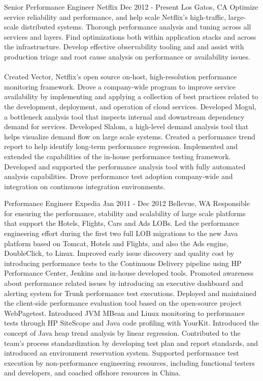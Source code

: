 \documentclass[]{mspier-cv}
\begin{document}
\experienceitem
  {Senior Performance Engineer}
  {Netflix}
  {Dec 2012 - Present}
  {Los Gatos, CA}
  {Optimize service reliability and performance, and help scale Netflix's high-traffic, large-scale distributed systems. Thorough performance analysis and tuning across all services and layers. Find optimizations both within application stacks and across the infrastructure. Develop effective observability tooling and and assist with production triage and root cause analysis on performance or availability issues.\\\\
  Created Vector, Netflix's open source on-host, high-resolution performance monitoring framework. Drove a company-wide program to improve service availability by implementing and applying a collection of best practices related to the development, deployment, and operation of cloud services. Developed Mogul, a bottleneck analysis tool that inspects internal and downstream dependency demand for services. Developed Slalom, a high-level demand analysis tool that helps visualize demand flow on large scale systems. Created a performance trend report to help identify long-term performance regression. Implemented and extended the capabilities of the in-house performance testing framework. Developed and supported the performance analysis tool with fully automated analysis capabilities. Drove performance test adoption company-wide and integration on continuous integration environments.\\}

\experienceitem
  {Performance Engineer}
  {Expedia}
  {Jan 2011 - Dec 2012}
  {Bellevue, WA}
  {
    Responsible for ensuring the performance, stability and scalability of large scale platforms that support the Hotels, Flights, Cars and Ads LOBs.
    Led the performance engineering effort during the first two full LOB migrations to the new Java platform based on Tomcat, Hotels and Flights, and also the Ads engine, DoubleClick, to Linux.
    Improved early issue discovery and quality cost by introducing performance tests to the Continuous Delivery pipeline using HP Performance Center, Jenkins and in-house developed tools.
    Promoted awareness about performance related issues by introducing an executive dashboard and alerting system for Trunk performance test executions.
    Deployed and maintained the client-side performance evaluation tool based on the open-source project WebPagetest.
    Introduced JVM MBean and Linux monitoring to performance tests through HP SiteScope and Java code profiling with YourKit.
    Introduced the concept of Java heap trend analysis by linear regression.
    Contributed to the team’s process standardization by developing test plan and report standards, and introduced an environment reservation system.
    Supported performance test execution by non-performance engineering resources, including functional testers and developers, and coached offshore resources in China.
  }
\end{document}
